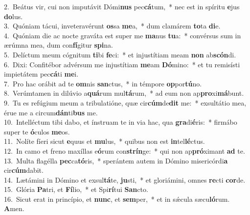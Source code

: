 {2.~}Beátus vir, cui non imputávit Dómi\textbf{nus} pec\textbf{cá}tum,~* nec est in spíritu \textbf{e}jus \textbf{do}lus.\\
{3.~}Quóniam tácui, inveteravérunt \textbf{os}sa \textbf{me}a,~* dum clamárem \textbf{to}ta \textbf{di}e.\\
{4.~}Quóniam die ac nocte graváta est super me \textbf{ma}nus \textbf{tu}a:~* convérsus sum in ærúmna mea, dum con\textbf{fí}gitur \textbf{spi}na.\\
{5.~}Delíctum meum cógnitum \textbf{ti}bi \textbf{fe}ci:~* et injustítiam meam \textbf{non} ab\textbf{scón}di.\\
{6.~}Dixi: Confitébor advérsum me injustítiam \textbf{me}am \textbf{Dó}mino:~* et tu remisísti impietátem pec\textbf{cá}ti \textbf{me}i.\\
{7.~}Pro hac orábit ad te \textbf{om}nis \textbf{san}ctus,~* in témpore \textbf{op}por\textbf{tú}no.\\
{8.~}Verúmtamen in dilúvio a\textbf{quá}rum mul\textbf{tá}rum,~* ad eum non ap\textbf{pro}xi\textbf{má}bunt.\\
{9.~}Tu es refúgium meum a tribulatióne, quæ cir\textbf{cúm}de\textbf{dit} me:~* exsultátio mea, érue me a circum\textbf{dán}ti\textbf{bus} me.\\
{10.~}Intelléctum tibi dabo, et ínstruam te in via hac, qua \textbf{gra}di\textbf{é}ris:~* firmábo super te \textbf{ó}culos \textbf{me}os.\\
{11.~}Nolíte fíeri sicut \textbf{e}quus et \textbf{mu}lus,~* quibus non est \textbf{in}tel\textbf{lé}ctus.\\
{12.~}In camo et freno maxíllas e\textbf{ó}rum con\textbf{strín}ge:~* qui non ap\textbf{pró}ximant \textbf{ad} te.\\
{13.~}Multa flagélla \textbf{pec}ca\textbf{tó}ris,~* sperántem autem in Dómino misericórdi\textbf{a} cir\textbf{cúm}dabit.\\
{14.~}Lætámini in Dómino et exsul\textbf{tá}te, \textbf{ju}sti,~* et gloriámini, omnes \textbf{re}cti \textbf{cor}de.\\
{15.~}Glória \textbf{Pa}tri, et \textbf{Fí}lio,~* et Spi\textbf{rí}tui \textbf{San}cto.\\
{16.~}Sicut erat in princípio, et \textbf{nunc}, et \textbf{sem}per,~* et in sǽcula sæcu\textbf{ló}rum. \textbf{A}men.\\
